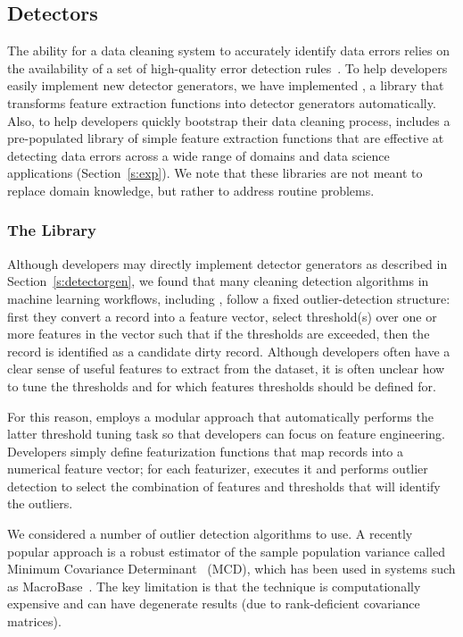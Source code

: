 \subsection{Detectors}
The ability for a data cleaning system to accurately identify data errors relies on the availability of a set of high-quality error detection rules~\cite{DBLP:conf/sigmod/ChuIKW16}.  To help developers easily implement new detector generators, we have implemented \detectlib, a library that transforms feature extraction functions into detector generators automatically.  Also, to help developers quickly bootstrap their data cleaning process, \sys includes a pre-populated library of simple feature extraction functions that are effective at detecting data errors across a wide range of domains and data science applications (Section~\ref{s:exp}).  We note that these libraries are not meant to replace domain knowledge, but rather to address routine problems.

\subsubsection{The \detectlib Library}
Although developers may directly implement detector generators as described in Section~\ref{s:detectorgen}, we found that many cleaning detection algorithms in machine learning workflows, including \company, follow a fixed outlier-detection structure: first they convert a record into a feature vector,  select threshold(s) over one or more features in the vector such that if the thresholds are exceeded, then the record is identified as a candidate dirty record.  Although developers often have a clear sense of useful features to extract from the dataset, it is often unclear how to tune the thresholds and for which features thresholds should be defined for.  

For this reason, \detectlib employs a modular approach that automatically performs the latter threshold tuning task so that developers can focus on feature engineering.   Developers simply define featurization functions that map records into a numerical feature vector; for each featurizer, \detectlib executes it and performs outlier detection to select the combination of features and thresholds that will identify the outliers.  

We considered a number of outlier detection algorithms to use.  A recently popular approach is a robust estimator of the sample population variance called Minimum Covariance Determinant~\cite{} (MCD), which has been used in systems such as MacroBase~\cite{bailis2016macrobase}.  The key limitation is that the technique is computationally expensive and can have degenerate results (due to rank-deficient covariance matrices).

